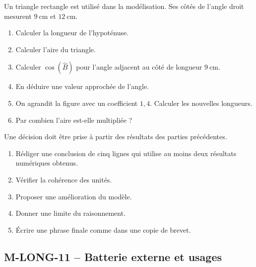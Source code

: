 \documentclass[11pt,a4paper]{article}
\newcounter{exercice}
\begin{document}
\begin{exercice}
Un triangle rectangle est utilisé dans la modélisation. Ses côtés de l'angle droit mesurent $9\ \mathrm{cm}$ et $12\ \mathrm{cm}$.
\begin{enumerate}
  \item Calculer la longueur de l'hypoténuse.
  \item Calculer l'aire du triangle.
  \item Calculer $\cos(\widehat{B})$ pour l'angle adjacent au côté de longueur $9\ \mathrm{cm}$.
  \item En déduire une valeur approchée de l'angle.
  \item On agrandit la figure avec un coefficient $1{,}4$. Calculer les nouvelles longueurs.
  \item Par combien l'aire est-elle multipliée ?
\end{enumerate}
\end{exercice}

\begin{exercice}
Une décision doit être prise à partir des résultats des parties précédentes.
\begin{enumerate}
  \item Rédiger une conclusion de cinq lignes qui utilise au moins deux résultats numériques obtenus.
  \item Vérifier la cohérence des unités.
  \item Proposer une amélioration du modèle.
  \item Donner une limite du raisonnement.
  \item Écrire une phrase finale comme dans une copie de brevet.
\end{enumerate}
\end{exercice}
\newpage
\subsection{M-LONG-11 -- Batterie externe et usages}
\end{document}
